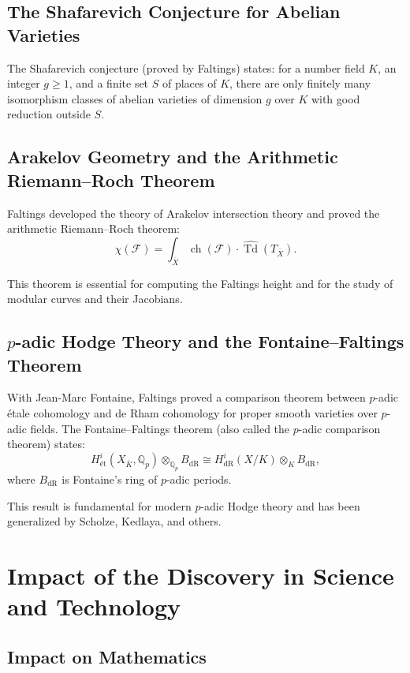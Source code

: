 \subsection{The Shafarevich Conjecture for Abelian Varieties}

The Shafarevich conjecture (proved by Faltings) states: for a number field $K$, an integer $g \geq 1$, and a finite set $S$ of places of $K$, there are only finitely many isomorphism classes of abelian varieties of dimension $g$ over $K$ with good reduction outside $S$.

\subsection{Arakelov Geometry and the Arithmetic Riemann--Roch Theorem}

Faltings developed the theory of Arakelov intersection theory and proved the arithmetic Riemann--Roch theorem:
\[
\chi(\mathcal{F}) = \int_{\overline{X}} \operatorname{ch}(\mathcal{F}) \cdot \widehat{\operatorname{Td}}(T_{\overline{X}}).
\]

This theorem is essential for computing the Faltings height and for the study of modular curves and their Jacobians.

\subsection{$p$-adic Hodge Theory and the Fontaine--Faltings Theorem}

With Jean-Marc Fontaine, Faltings proved a comparison theorem between $p$-adic \'etale cohomology and de Rham cohomology for proper smooth varieties over $p$-adic fields. The Fontaine--Faltings theorem (also called the $p$-adic comparison theorem) states:
\[
H^i_{\text{\'et}}(X_{\overline{K}}, \mathbb{Q}_p) \otimes_{\mathbb{Q}_p} B_{\text{dR}} \cong H^i_{\text{dR}}(X/K) \otimes_K B_{\text{dR}},
\]
where $B_{\text{dR}}$ is Fontaine's ring of $p$-adic periods.

This result is fundamental for modern $p$-adic Hodge theory and has been generalized by Scholze, Kedlaya, and others.

\section{Impact of the Discovery in Science and Technology}

\subsection{Impact on Mathematics}

